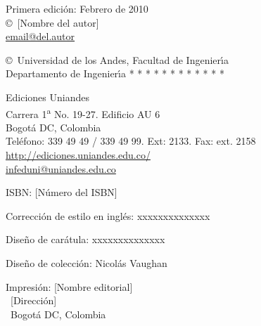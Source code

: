 %


\hbox{}\thispagestyle{empty}

\vspace*{-2cm}
\begin{center}
\noindent
{}

\end{center}

\vfill


{%
\parindent=0pt
\scriptsize

Primera edici{\'o}n:  Febrero de 2010\\

\copyright\ [Nombre del autor]\\
\url{email@del.autor}

\medskip

\copyright\ Universidad de los Andes, Facultad de Ingenier\'{\i}a\\
\phantom{\copyright\ }Departamento de Ingenier\'{\i}a * * * * * * * * * * * * \\

\bigskip

Ediciones Uniandes\\ Carrera 1\textsuperscript{a} No. 19-27. Edificio AU 6\\
Bogot{\'a} \textsc{DC}, Colombia\\
Tel{\'e}fono: 339 49 49 / 339 49 99. Ext: 2133. Fax: ext. 2158\\
\url{http://ediciones.uniandes.edu.co/}\\
\url{infeduni@uniandes.edu.co}

\bigskip

ISBN: [N{\'u}mero del ISBN]

\bigskip

Correcci{\'o}n de estilo en ingl{\'e}s: xxxxxxxxxxxxxx

\bigskip

Dise{\~n}o de car{\'a}tula: xxxxxxxxxxxxxx

\bigskip

Dise{\~n}o de colecci{\'o}n: Nicol{\'a}s Vaughan

\bigskip

Impresi{\'o}n: [Nombre editorial] \\ \
[Direcci{\'o}n] \\ \
Bogot{\'a} \textsc{DC}, Colombia

}

